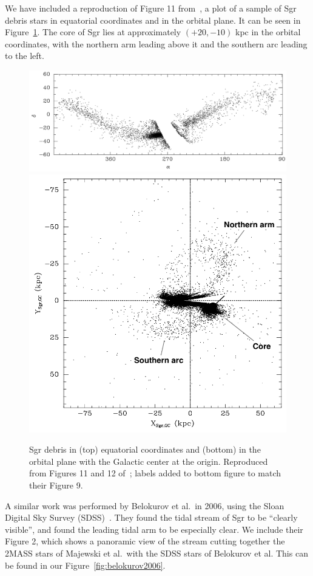 We have included a reproduction of Figure 11 from~\cite{majewski_two_2003}, a
plot of a sample of Sgr debris stars in equatorial coordinates and in the
orbital plane. It can be seen in Figure~\ref{fig:majewski}. The core of Sgr
lies at approximately $(+20, -10)$ kpc in the orbital coordinates, with the
northern arm leading above it and the southern arc leading to the left.

\begin{figure}
    \centering 
    \includegraphics[width=0.7\linewidth]{figs/majewski2003-12.png}
    \includegraphics[width=0.45\linewidth]{figs/majewski2003-11.png}
    \caption{%
        Sgr debris in (top) equatorial coordinates and (bottom) in the orbital
        plane with the Galactic center at the origin. Reproduced from Figures
        11 and 12 of~\cite{majewski_two_2003}; labels added to bottom figure to
        match their Figure 9.
    }
    \label{fig:majewski}
\end{figure}

A similar work was performed by Belokurov et al.~in 2006, using the Sloan
Digital Sky Survey (SDSS)~\cite{belokurov_field_2006}. They found the tidal
stream of Sgr to be ``clearly visible'', and found the leading tidal arm to be
especially clear. We include their Figure 2, which shows a panoramic view of
the stream cutting together the 2MASS stars of Majewski et al.~with the SDSS
stars of Belokurov et al. This can be found in our
Figure~\ref{fig:belokurov2006}.

